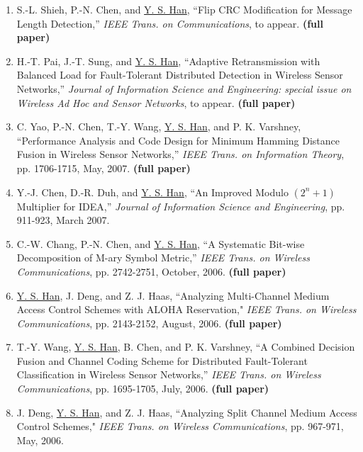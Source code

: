 \begin{llist}
\begin{itemize}
\begin{enumerate}
\item S.-L. Shieh, P.-N. Chen, and \underline{Y. S. Han}, ``Flip CRC Modification
for Message Length Detection,'' {\it IEEE Trans. on Communications}, to appear.
{\bf (full paper)}



\item H.-T. Pai, J.-T. Sung, and \underline{Y. S. Han}, ``Adaptive
Retransmission with Balanced Load for Fault-Tolerant Distributed Detection in
Wireless Sensor Networks,'' {\it Journal of Information Science and
Engineering: special issue on Wireless Ad Hoc and Sensor Networks}, to appear.
{\bf (full paper)}

\item C. Yao, P.-N. Chen, T.-Y. Wang, \underline{Y. S. Han}, and P. K.
Varshney, ``Performance Analysis and Code Design for Minimum Hamming Distance
Fusion in Wireless Sensor Networks,'' {\it IEEE Trans. on Information Theory},
pp. 1706-1715, May, 2007. {\bf (full paper)}

\item Y.-J. Chen, D.-R. Duh, and \underline{Y. S. Han}, ``An Improved Modulo
$(2^n+1)$ Multiplier for IDEA,'' {\it Journal of Information Science and
Engineering},  pp. 911-923, March 2007.

\item C.-W. Chang, P.-N. Chen, and \underline{Y. S. Han}, ``A Systematic Bit-wise
Decomposition of M-ary Symbol Metric,'' {\it IEEE Trans. on Wireless
Communications}, pp. 2742-2751, October, 2006. {\bf (full paper)}

\item \underline{Y. S. Han}, J. Deng,  and Z. J. Haas, ``Analyzing
Multi-Channel Medium Access Control Schemes with ALOHA Reservation,"
{\it IEEE Trans. on Wireless Communications},  pp. 2143-2152,
August, 2006. {\bf (full paper)}

\item T.-Y. Wang, \underline{Y. S. Han}, B. Chen, and P. K.
Varshney, ``A Combined Decision Fusion and Channel Coding Scheme for
Distributed Fault-Tolerant Classification in Wireless Sensor
Networks,'' {\it IEEE Trans. on Wireless Communications}, pp.
1695-1705, July, 2006. {\bf (full paper)}



\item J. Deng, \underline{Y. S. Han},  and Z. J. Haas, ``Analyzing
Split Channel Medium Access Control Schemes," {\it IEEE Trans. on
Wireless Communications},  pp. 967-971, May, 2006.






\end{enumerate}
\end{itemize}
\end{llist}
